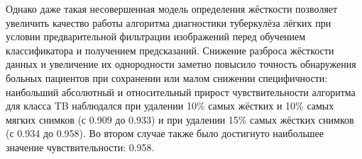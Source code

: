 Однако даже такая несовершенная модель определения жёсткости позволяет увеличить качество работы алгоритма диагностики туберкулёза лёгких при условии предварительной фильтрации изображений перед обучением классификатора и получением предсказаний. Снижение разброса жёсткости данных и увеличение их однородности заметно повысило точность обнаружения больных пациентов при сохранении или малом снижении специфичности: наибольший абсолютный и относительный прирост чувствительности алгоритма для класса TB наблюдался при удалении 10\% самых жёстких и 10\% самых мягких снимков (с 0.909 до 0.933) и при удалении 15\% самых жёстких снимков (с 0.934 до 0.958). Во втором случае также было достигнуто наибольшее значение чувствительности: 0.958.


\FloatBarrier 
